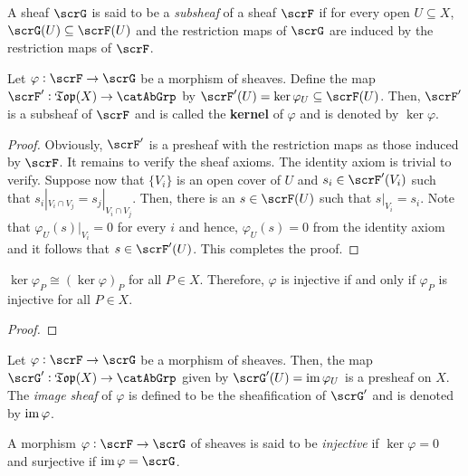 \begin{definition}[Subsheaf]
    A sheaf $\scrG$ is said to be a \emph{subsheaf} of a sheaf $\scrF$ if for every open $U\subseteq X$, $\scrG(U)\subseteq\scrF(U)$ and the restriction maps of $\scrG$ are induced by the restriction maps of $\scrF$.
\end{definition}

\begin{proposition}
    Let $\varphi:\scrF\to\scrG$ be a morphism of sheaves. Define the map $\scrF':\mathfrak{Top}(X)\to\catAbGrp$ by $\scrF'(U) = \ker\varphi_U\subseteq\scrF(U)$. Then, $\scrF'$ is a subsheaf of $\scrF$ and is called the \textbf{kernel} of $\varphi$ and is denoted by $\ker\varphi$.
\end{proposition}
\begin{proof}
    Obviously, $\scrF'$ is a presheaf with the restriction maps as those induced by $\scrF$. It remains to verify the sheaf axioms. The identity axiom is trivial to verify. Suppose now that $\{V_i\}$ is an open cover of $U$ and $s_i\in\scrF'(V_i)$ such that $s_i|_{V_i\cap V_j} = s_j|_{V_i\cap V_j}$. Then, there is an $s\in\scrF(U)$ such that $s|_{V_i} = s_i$. Note that $\varphi_U(s)|_{V_i} = 0$ for every $i$ and hence, $\varphi_U(s) = 0$ from the identity axiom and it follows that $s\in\scrF'(U)$. This completes the proof.
\end{proof}

\begin{proposition}
    $\ker\varphi_P\cong(\ker\varphi)_P$ for all $P\in X$. Therefore, $\varphi$ is injective if and only if $\varphi_P$ is injective for all $P\in X$.
\end{proposition}
\begin{proof}
\end{proof}

\begin{definition}
    Let $\varphi:\scrF\to\scrG$ be a morphism of sheaves. Then, the map $\scrG':\mathfrak{Top}(X)\to\catAbGrp$ given by $\scrG'(U) = \im\varphi_U$ is a presheaf on $X$. The \emph{image sheaf} of $\varphi$ is defined to be the sheafification of $\scrG'$ and is denoted by $\operatorname{im}\varphi$.
\end{definition}

\begin{definition}
    A morphism $\varphi:\scrF\to\scrG$ of sheaves is said to be \emph{injective} if $\ker\varphi = 0$ and surjective if $\im\varphi = \scrG$.
\end{definition}

